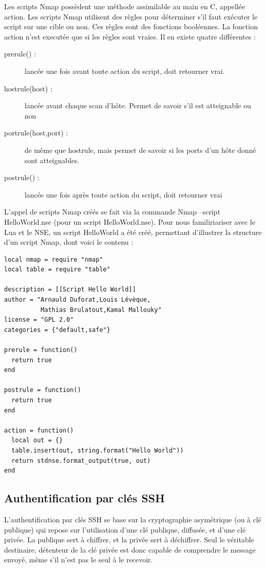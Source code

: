 \documentclass[frenchb]{article}
\begin{document}
Les scripts Nmap possèdent une méthode assimilable au \textsf{main} en C, appellée \textsf{action}. Les scripts Nmap utilisent des règles pour déterminer s'il faut exécuter le script sur une cible ou non. Ces règles sont des fonctions booléennes. La fonction \textsf{action} n'est executée que si les règles sont vraies. Il en existe quatre différentes :

\begin{description}
\item [prerule() :] lancée une fois avant toute action du script, doit retourner vrai.
\item [hostrule(host) :] lancée avant chaque scan d'hôte. Permet de savoir s'il est atteignable ou non
\item [portrule(host,port) :] de même que hostrule, mais permet de savoir si les ports d'un hôte donné sont atteignables.
\item [postrule() :] lancée une fois après toute action du script, doit retourner vrai
\end{description}

L'appel de scripts Nmap créés se fait via la commande \textsf{Nmap --script HelloWorld.nse} (pour un script \textsf{HelloWorld.nse}). Pour nous familiriariser avec le Lua et le NSE, un script HelloWorld a été créé, permettant d'illustrer la structure d'un script Nmap, dont voici le contenu :
\begin{verbatim}
local nmap = require "nmap" 
local table = require "table" 

description = [[Script Hello World]] 
author = "Arnauld Duforat,Louis Lévèque,
          Mathias Brulatout,Kamal Mallouky" 
license = "GPL 2.0" 
categories = {"default,safe"} 

prerule = function()
  return true
end

postrule = function() 
  return true 
end 

action = function() 
  local out = {} 
  table.insert(out, string.format("Hello World"))
  return stdnse.format_output(true, out)  
end
\end{verbatim}

\subsection{Authentification par clés SSH}
L'authentification par clés SSH se base sur la cryptographie asymétrique (ou à clé publique) qui repose sur l'utilisation d'une clé publique, diffusée, et d'une clé privée. La publique sert à chiffrer, et la privée sert à déchiffrer. Seul le véritable destinaire, détenteur de la clé privée est donc capable de comprendre le message envoyé, même s'il n'est pas le seul à le recevoir.
\end{document}
